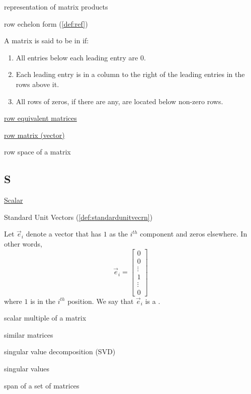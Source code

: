 \documentclass{ximera}
\begin{document}
representation of matrix products

row echelon form (\ref{def:ref})
\begin{expandable}
    A matrix is said to be in  if:
\begin{enumerate}
\item All entries below each leading entry are 0.
\item Each leading entry is in a column to the right of the leading entries in the rows above it.
\item All rows of zeros, if there are any, are located below non-zero rows.
\end{enumerate}
\end{expandable}

\href{https://ximera.osu.edu/oerlinalg/LinearAlgebra/SYS-0020/main}{row equivalent matrices}

\href{https://ximera.osu.edu/oerlinalg/LinearAlgebra/MAT-0010/main}{row matrix (vector)}

row space of a matrix


\subsection{S}
\href{https://ximera.osu.edu/oerlinalg/LinearAlgebra/VEC-0010/main}{Scalar} 

Standard Unit Vectors (\ref{def:standardunitvecrn})
\begin{expandable}
  Let $\vec{e}_i$ denote a vector that has $1$ as the $i^{th}$ component and zeros elsewhere.  In other words, $$\vec{e}_i=\begin{bmatrix}
0\\
0\\
\vdots\\
1\\
\vdots\\
0
\end{bmatrix}$$ 
  where $1$ is in the $i^{th}$ position.  We say that  $\vec{e}_i$ is a .
\end{expandable}

scalar multiple of a matrix

similar matrices

singular value decomposition (SVD)

singular values

span of a set of matrices
\end{document}

